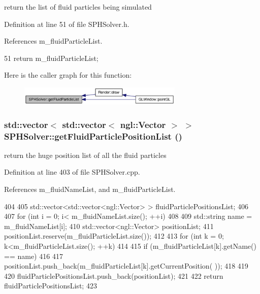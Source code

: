 return the list of fluid particles being simulated 



Definition at line 51 of file SPHSolver.h.



References m\_\-fluidParticleList.




\begin{DoxyCode}
51 {return m_fluidParticleList;}
\end{DoxyCode}




Here is the caller graph for this function:\nopagebreak
\begin{figure}[H]
\begin{center}
\leavevmode
\includegraphics[width=222pt]{class_s_p_h_solver_ad389df7449294b5a8de1fc163acbf29b_icgraph}
\end{center}
\end{figure}


\hypertarget{class_s_p_h_solver_ab8ad27fc25e030d731e249ccfd2efd20}{
\subsubsection[{getFluidParticlePositionList}]{\setlength{\rightskip}{0pt plus 5cm}std::vector$<$ std::vector$<$ ngl::Vector $>$ $>$ SPHSolver::getFluidParticlePositionList ()}}
\label{class_s_p_h_solver_ab8ad27fc25e030d731e249ccfd2efd20}


return the huge position list of all the fluid particles 



Definition at line 403 of file SPHSolver.cpp.



References m\_\-fluidNameList, and m\_\-fluidParticleList.




\begin{DoxyCode}
404 {
405     std::vector<std::vector<ngl::Vector> > fluidParticlePositionsList;
406 
407     for (int i = 0; i< m_fluidNameList.size(); ++i)
408     {
409         std::string name = m_fluidNameList[i];
410         std::vector<ngl::Vector> positionList;
411         positionList.reserve(m_fluidParticleList.size());
412 
413         for (int k = 0; k<m_fluidParticleList.size(); ++k)
414         {
415             if (m_fluidParticleList[k].getName() == name)
416             {
417                 positionList.push_back(m_fluidParticleList[k].getCurrentPosition(
      ));
418             }
419         }
420         fluidParticlePositionsList.push_back(positionList);
421     }
422     return fluidParticlePositionsList;
423 }
\end{DoxyCode}




